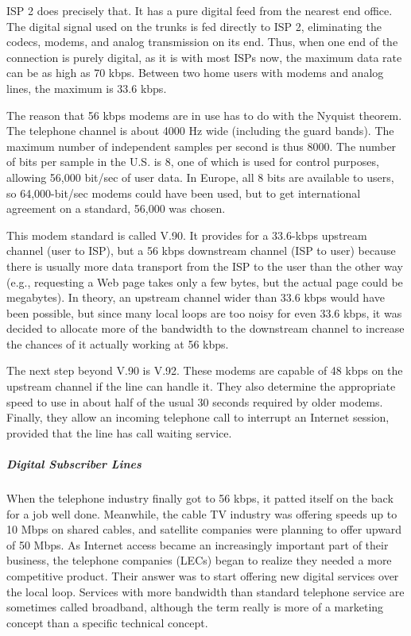 \documentclass[b5paper,11pt]{memoir}
\begin{document}
ISP 2 does precisely that. It has a pure digital feed from the nearest
end office. The digital signal used on the trunks is fed directly to ISP
2, eliminating the codecs, modems, and analog transmission on its end.
Thus, when one end of the connection is purely digital, as it is with
most ISPs now, the maximum data rate can be as high as 70 kbps. Between
two home users with modems and analog lines, the maximum is 33.6 kbps.

The reason that 56 kbps modems are in use has to do with the Nyquist
theorem. The telephone channel is about 4000 Hz wide (including the
guard bands). The maximum number of independent samples per second is
thus 8000. The number of bits per sample in the U.S. is 8, one of which
is used for control purposes, allowing 56,000 bit/sec of user data. In
Europe, all 8 bits are available to users, so 64,000-bit/sec modems
could have been used, but to get international agreement on a standard,
56,000 was chosen.

This modem standard is called {V.90}. It provides for a 33.6-kbps
upstream channel (user to ISP), but a 56 kbps downstream channel (ISP to
user) because there is usually more data transport from the ISP to the
user than the other way (e.g., requesting a Web page takes only a few
bytes, but the actual page could be megabytes). In theory, an upstream
channel wider than 33.6 kbps would have been possible, but since many
local loops are too noisy for even 33.6 kbps, it was decided to allocate
more of the bandwidth to the downstream channel to increase the chances
of it actually working at 56 kbps.

The next step beyond V.90 is {V.92}. These modems are capable of 48 kbps
on the upstream channel if the line can handle it. They also determine
the appropriate speed to use in about half of the usual 30 seconds
required by older modems. Finally, they allow an incoming telephone call
to interrupt an Internet session, provided that the line has call
waiting service.

\protect\hypertarget{0130661023_ch02lev1sec5.htmlux5cux23ch02lev3sec10}{}{}

\subparagraph{Digital Subscriber Lines}

When the telephone industry finally got to 56 kbps, it patted itself on
the back for a job well done. Meanwhile, the cable TV industry was
offering speeds up to 10 Mbps on shared cables, and satellite companies
were planning to offer upward of 50 Mbps. As Internet access became an
increasingly important part of their business, the telephone companies
(LECs) began to realize they needed a more competitive product. Their
answer was to start offering new digital services over the local loop.
Services with more bandwidth than standard telephone service are
sometimes called {broadband}, although the term really is more of a
marketing concept than a specific technical concept.
\end{document}
